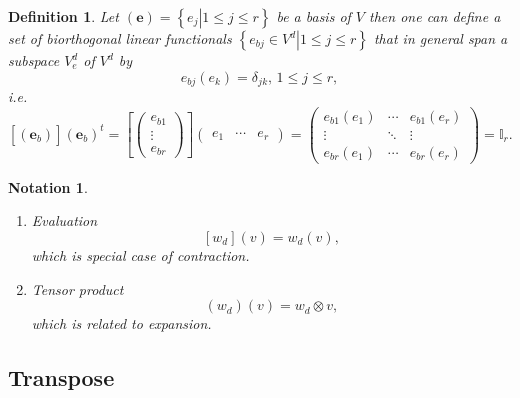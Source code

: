 \documentclass[aps,preprint]{revtex4}
\newtheorem{definition}[theorem]{Definition}
\newtheorem{notation}[theorem]{Notation}
\begin{document}
\begin{definition}
Let $\left( \boldsymbol{e}\right) =\left\{ \left. e_{j}\right\vert 1\leq
j\leq r\right\} $ be a basis of $V$ then one can define a set of
biorthogonal linear functionals $\left\{ \left. e_{bj}\in V^{d}\right\vert
1\leq j\leq r\right\} $ that in general span \emph{a subspace } $V_{e}^{d}$
of $V^{d}$ by 
\begin{equation}
e_{bj}\left( e_{k}\right) =\delta _{jk},\,1\leq j\leq r,
\end{equation}%
i.e. 
\begin{equation}
\left[ \overset{}{\left( \boldsymbol{e}_{b}\right) }\right] \left( \overset{}%
{\boldsymbol{e}_{b}}\right) ^{t}=\left[ \left( 
\begin{array}{c}
e_{b1} \\ 
\vdots \\ 
e_{br}%
\end{array}%
\right) \right] \left( 
\begin{array}{ccc}
e_{1} & \cdots & e_{r}%
\end{array}%
\right) =\left( 
\begin{array}{ccc}
e_{b1}\left( e_{1}\right) & \cdots & e_{b1}\left( e_{r}\right) \\ 
\vdots & \ddots & \vdots \\ 
e_{br}\left( e_{1}\right) & \cdots & e_{br}\left( e_{r}\right)%
\end{array}%
\right) =\mathbb{I}_{r}.
\end{equation}
\end{definition}

\begin{notation}
\begin{enumerate}
\item Evaluation%
\begin{equation}
\left[ w_{d}\right] \left( v\right) =w_{d}\left( v\right) ,
\end{equation}%
which is special case of contraction.

\item Tensor product 
\begin{equation}
\left( w_{d}\right) \left( v\right) =w_{d}\otimes v,
\end{equation}%
which is related to expansion.
\end{enumerate}
\end{notation}

\subsection{Transpose \label{Transpose}}
\end{document}
